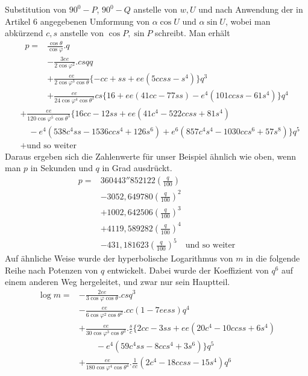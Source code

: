 %
Substitution von \(90^0-P\), \(90^0-Q\) anstelle von \(w,U\) und nach Anwendung der in Artikel 6 angegebenen Umformung von \(\alpha\cos U\) und \(\alpha\sin U\), wobei man abkürzend \(c,s\) anstelle von \(\cos P,\sin P\) schreibt. Man erhält
\[
\begin{aligned}
p={}&\frac{\cos\theta}{\cos\varphi}\mathord{.}q\\
&-\frac{3ee}{2\cos\varphi^2}\mathord{.}csqq\\
&+\frac{ee}{2\cos\varphi^3\cos\theta}\{-cc+ss+ee(5ccss-s^4)\}q^3\\
&+\frac{ee}{24\cos\varphi^4\cos\theta^2}cs\{16+ee(41cc-77ss)-e^4(101ccss-61s^4)\}q^4
\end{aligned}
\]
\[
\begin{aligned}
&+\frac{ee}{120\cos\varphi^5\cos\theta^3}\{16cc-12ss+ee(41c^4-522ccss+81s^4)\\
&\quad-e^4(538c^4ss-1536ccs^4+126s^6)+e^6(857c^4s^4-1030ccs^6+57s^8)\}q^5\\
&+\text{und so weiter}
\end{aligned}
\]
\indent Daraus ergeben sich die Zahlenwerte für unser Beispiel ähnlich wie oben, wenn man \(p\) in Sekunden und \(q\) in Grad ausdrückt.
\[
\begin{aligned}
p={}&360443''852122(\frac{q}{100})\\
&-3052{,}649780(\frac{q}{100})^2\\
&+1002{,}642506(\frac{q}{100})^3\\
&+4119{,}589282(\frac{q}{100})^4\\
&-431{,}181623(\frac{q}{100})^5\quad\text{und so weiter}
\end{aligned}
\]
\indent Auf ähnliche Weise wurde der hyperbolische Logarithmus von \(m\) in die folgende Reihe nach Potenzen von \(q\) entwickelt. Dabei wurde der Koeffizient von \(q^6\) auf einem anderen Weg hergeleitet, und zwar nur sein Hauptteil.
\[
\begin{aligned}
\log m={}&-\frac{2ee}{3\cos\varphi\cos\theta}\mathord{.}csq^3\\
&-\frac{ee}{6\cos\varphi^2\cos\theta^2}\mathord{.}cc(1-7eess)q^4\\
&+\frac{ee}{30\cos\varphi^3\cos\theta^3}\mathord{.}\frac{s}{c}\{2cc-3ss+ee(20c^4-10ccss+6s^4)\\
&\qquad-e^4(59c^4ss-8ccs^4+3s^6)\}q^5\\
&+\frac{ee}{180\cos\varphi^4\cos\theta^4}\mathord{.}\frac{1}{cc}(2c^4-18ccss-15s^4)q^6
\end{aligned}
\]
